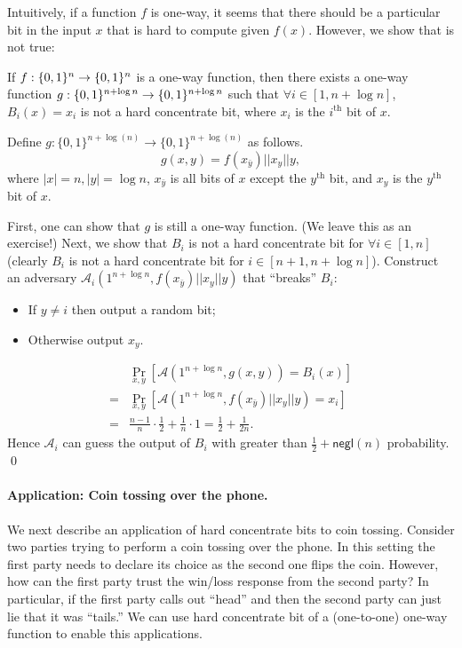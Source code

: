 \bigskip
Intuitively, if a function $f$ is one-way, it seems that there should be a particular bit in the input $x$ that is hard to compute given $f(x)$. However, we show that is not true:
\begin{claim}
If $f:\{0,1\}^{n}\rightarrow \{0,1\}^{n}$ is a one-way function, then there exists a one-way function $g:\{0,1\}^{n+\log n}\rightarrow\{0,1\}^{n+\log n}$ such that $\forall i \in [1, n+\log n]$, $B_i(x) = x_i$ is not a hard concentrate bit, where $x_i$ is the $i^\text{th}$ bit of $x$.
\end{claim}
\proof
Define $g:\{0,1\}^{n+\log(n)} \rightarrow \{0,1\}^{n+\log(n)}$ as follows.
$$g(x,y) = f(x_{\bar y}) || x_y || y,$$
where $|x| = n, |y| = \log n$, $x_{\bar y}$ is all bits of $x$ except the $y^\text{th}$ bit, and $x_y$ is the $y^\text{th}$ bit of $x$.

First, one can show that $g$ is still a one-way function. (We leave this as an exercise!)
Next, we show that $B_i$ is not a hard concentrate bit for $\forall i \in [1, n]$ (clearly $B_i$ is not a hard concentrate bit for $i \in [n+1, n+\log n]$).
Construct an adversary $\mathcal{A}_i(1^{n+\log n}, f(x_{\bar y}) || x_y || y)$ that ``breaks'' $B_i$:
\begin{itemize}
\item[-] If $y \not= i$ then output a random bit;
\item[-] Otherwise output $x_y$.
\end{itemize}
\begin{align*}
& \Pr_{x, y}[\mathcal{A}(1^{n+\log n}, g(x,y)) = B_i(x)]\\
=& \Pr_{x, y}[\mathcal{A}(1^{n+\log n}, f(x_{\bar y}) || x_y || y) = x_i]\\
=& \frac{n-1}{n} \cdot \frac{1}{2} + \frac{1}{n} \cdot 1 = \frac{1}{2} + \frac{1}{2n}.
\end{align*}
Hence $\mathcal{A}_i$ can guess the output of $B_i$ with greater than $\frac{1}{2} + \mathsf{negl}(n)$ probability.
\qed


\iffalse
\paragraph{Application: Coin tossing over the phone.} We next describe an application of hard concentrate bits to coin tossing.
Consider two parties trying to perform a coin tossing over the phone. In this setting the first party needs to declare its choice as the second one flips the coin. However, how can the first party trust the win/loss response from the second party?  In particular, if the first party calls out ``head'' and then the second party can just lie that it was ``tails.'' We can use hard concentrate bit of a (one-to-one) one-way function to  enable this applications.


